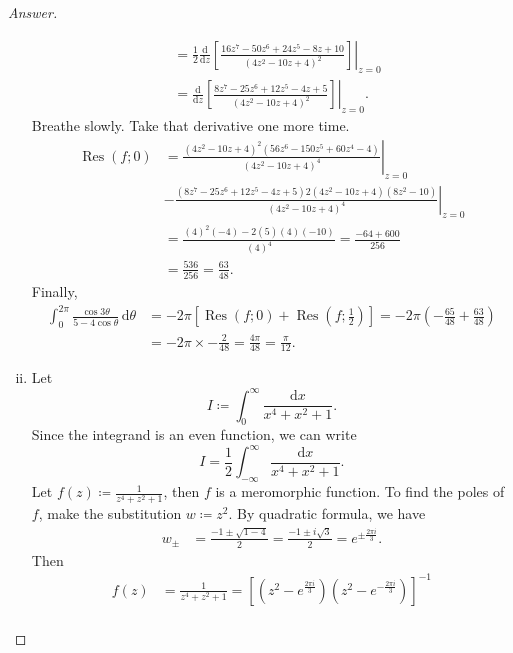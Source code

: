 \documentclass[12pt]{article}
\newcommand\inv[1]{#1^{-1}}
\newcommand\paren[1]{\left( #1 \right)}
\newcommand{\sqbrack}[1]{\left [ #1 \right ]}
\theoremstyle{definition}
\DeclareMathOperator\Res{Res}
\begin{document}
\begin{proof}[Answer]
\begin{enumerate}[(i)]
\begin{align*}
            & = \frac{1}{2} \frac{\mathrm{d}}{\mathrm{d}z} \left. \sqbrack{ \frac{ 16z^7 - 50z^6 + 24z^5 - 8z + 10 }{ \paren{ 4z^2 - 10z + 4 }^2 } } \right|_{z = 0} \\ 
            & = \frac{\mathrm{d}}{\mathrm{d}z} \left. \sqbrack{ \frac{ 8z^7 - 25z^6 + 12z^5 - 4z + 5 }{ \paren{ 4z^2 - 10z + 4 }^2 } } \right|_{z = 0}.
        \end{align*}
        Breathe slowly. Take that derivative one more time.
        \begin{align*}
            \Res(f;0) & = \left. \frac{ \paren{ 4z^2 - 10z + 4 }^2 \paren{ 56z^6 - 150z^5 + 60z^4 - 4 } }{ \paren{ 4z^2 - 10z + 4 }^4 } \right|_{z = 0} \\
            & - \left. \frac{ \paren{ 8z^7 - 25z^6 + 12z^5 - 4z + 5 } 2\paren{ 4z^2 - 10z + 4 } \paren{ 8z^2 - 10 } }{ \paren{ 4z^2 - 10z + 4 }^4 } \right|_{z = 0} \\[0.2em]
            & = \frac{ \paren{ 4 }^2 \paren{ - 4 } -2\paren{ 5 } \paren{ 4 } \paren{ - 10 } }{ \paren{ 4 }^4 }  = \frac{-64 + 600}{256} \\[0.2em]
            & = \frac{536}{256} = \frac{63}{48}.
        \end{align*}
        Finally,
        \begin{align*}
            \int_0^{2\pi} \frac{\cos 3 \theta}{5 - 4\cos \theta} \, \mathrm{d} \theta & = -2 \pi \sqbrack{ \Res(f;0) + \Res \paren{f ; \frac{1}{2} } } = -2 \pi \paren{ -\frac{65}{48} + \frac{63}{48} } \\
            & = -2 \pi \times - \frac{2}{48} = \frac{4\pi}{48} = \boxed{ \frac{\pi}{12} . }
        \end{align*}
        \item Let 
        \[
            I \coloneqq \int_0^{\infty} \frac{ \mathrm{d}x}{x^4 + x^2 + 1}.
        \]
        Since the integrand is an even function, we can write
        \[
            I = \frac{1}{2} \int_{-\infty}^{\infty} \frac{ \mathrm{d}x}{x^4 + x^2 + 1}.
        \]
        Let $f(z) \coloneqq \frac{1}{z^4 + z^2 + 1}$, then $f$ is a meromorphic function. To find the poles of $f$, make the substitution $w \coloneqq z^2$. By quadratic formula, we have 
        \begin{align*}
            w_{\pm} & = \frac{-1 \pm \sqrt{1-4}}{2} = \frac{-1 \pm i \sqrt{3}}{2} = e^{\pm\frac{2\pi i}{3}}.
        \end{align*}
        Then 
        \begin{align*}
            f(z) & = \frac{1}{z^4 + z^2 + 1} = \inv{ \sqbrack{ \paren{ z^2 - e^{\frac{2\pi i}{3}} } \paren{ z^2 - e^{-\frac{2\pi i}{3}} } } } \\

\end{align*}
\end{enumerate}
\end{proof}
\end{document}
